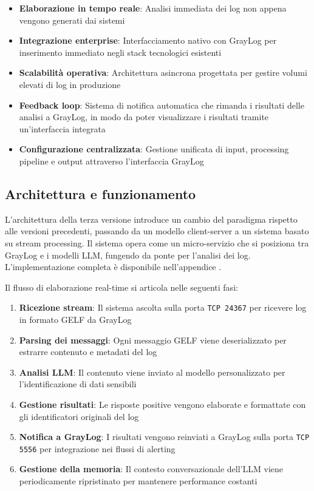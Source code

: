 \documentclass[12pt]{report}
\begin{document}
\begin{itemize}
    \item \textbf{Elaborazione in tempo reale}: Analisi immediata dei log non appena vengono generati dai sistemi
    \item \textbf{Integrazione enterprise}: Interfacciamento nativo con GrayLog per inserimento immediato negli stack tecnologici esistenti
    \item \textbf{Scalabilità operativa}: Architettura asincrona progettata per gestire volumi elevati di log in produzione
    \item \textbf{Feedback loop}: Sistema di notifica automatica che rimanda i risultati delle analisi a GrayLog, in modo da poter visualizzare i risultati tramite un'interfaccia integrata
    \item \textbf{Configurazione centralizzata}: Gestione unificata di input, processing pipeline e output attraverso l'interfaccia GrayLog
\end{itemize}

\subsection{Architettura e funzionamento}
\label{subsec:ver3_architettura}

L'architettura della terza versione introduce un cambio del paradigma rispetto alle versioni precedenti, passando da un modello client-server a un sistema basato su stream processing. Il sistema opera come un micro-servizio che si posiziona tra GrayLog e i modelli LLM, fungendo da ponte per l'analisi dei log. \\
L'implementazione completa è disponibile nell'appendice .

Il flusso di elaborazione real-time si articola nelle seguenti fasi:

\begin{enumerate}
    \item \textbf{Ricezione stream}: Il sistema ascolta sulla porta \texttt{TCP 24367} per ricevere log in formato GELF da GrayLog
    \item \textbf{Parsing dei messaggi}: Ogni messaggio GELF viene deserializzato per estrarre contenuto e metadati del log
    \item \textbf{Analisi LLM}: Il contenuto viene inviato al modello personalizzato per l'identificazione di dati sensibili
    \item \textbf{Gestione risultati}: Le risposte positive vengono elaborate e formattate con gli identificatori originali del log
    \item \textbf{Notifica a GrayLog}: I risultati vengono reinviati a GrayLog sulla porta \texttt{TCP 5556} per integrazione nei flussi di alerting
    \item \textbf{Gestione della memoria}: Il contesto conversazionale dell'LLM viene periodicamente ripristinato per mantenere performance costanti
\end{enumerate}
\end{document}
